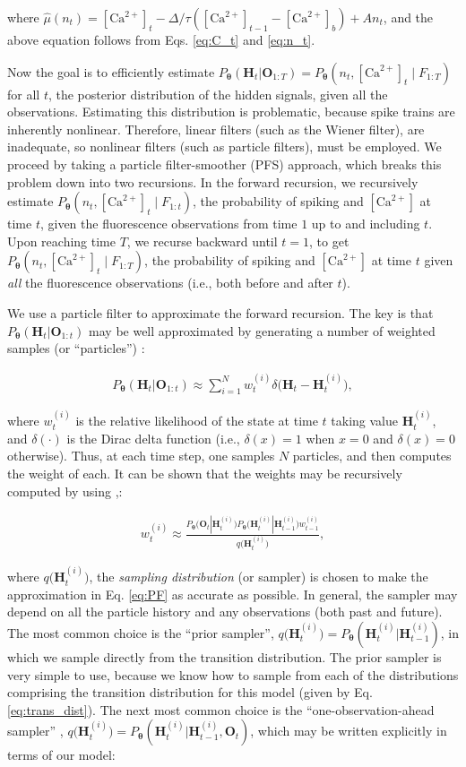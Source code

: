 \documentclass[10pt]{article}
\providecommand{\ve}[1]{\boldsymbol{#1}}
\providecommand{\ve}[1]{\boldsymbol{#1}}
\newcommand{\thetn}{\ve{\theta}}
\newcommand{\p}{P_{\thetn}}
\newcommand{\q}{q\big(\ve{H}_t^{(i)}\big)}
\newcommand{\Ca}{[\text{Ca}^{2+}]}
\begin{document}
\noindent where $\widehat{\mu}(n_t)=\Ca_t - \Delta/\tau(\Ca_{t-1}-\Ca_b) + A n_t$, and the above equation follows from Eqs. \ref{eq:C_t} and \ref{eq:n_t}.

Now the goal is to efficiently estimate $\p(\ve{H}_t | \ve{O}_{1:T})=\p(n_t, \Ca_t \mid F_{1:T})$  for all $t$, the posterior distribution of the hidden signals, given all the observations. Estimating this distribution is problematic, because spike trains are inherently nonlinear.  Therefore, linear filters (such as the Wiener filter), are inadequate, so nonlinear filters (such as particle filters), must be employed.   We proceed by taking a particle filter-smoother (PFS) approach, which breaks this problem down into two recursions.  In the forward recursion, we recursively estimate $\p(n_t, \Ca_t \mid F_{1:t})$, the probability of spiking and $\Ca$ at time $t$, given the fluorescence observations from time $1$ up to and including $t$.  Upon reaching time $T$, we recurse backward until $t=1$, to get $\p(n_t, \Ca_t \mid  F_{1:T})$, the probability of spiking and $\Ca$ at time $t$ given \emph{all} the fluorescence observations (i.e., both before and after $t$).


We use a particle filter to approximate the forward recursion.  The key is that $\p(\ve{H}_t | \ve{O}_{1:t})$ may be well approximated by generating a number of weighted samples (or ``particles'') \cite{DoucetGordon01}:

\begin{align} \label{eq:PF}
\p(\ve{H}_t |  \ve{O}_{1:t}) \approx \sum_{i=1}^N w_t^{(i)} \delta \big( \ve{H}_t - \ve{H}_t^{(i)}\big),
\end{align}

\noindent where $w_t^{(i)}$ is the relative likelihood of the state at time $t$ taking value $\ve{H}_t^{(i)}$, and $\delta(\cdot)$ is the Dirac delta function (i.e., $\delta(x)=1$ when $x=0$ and $\delta(x)=0$ otherwise). Thus, at each time step, one samples $N$ particles, and then computes the weight of each. It can be shown that the weights may be recursively computed by using \cite{DoucetGordon01},:

\begin{align} \label{eq:WEIGHT}
w_t^{(i)} \approx  \frac{\p\big(\ve{O}_t | \ve{H}_t^{(i)}\big) \p\big(\ve{H}_t^{(i)} | \ve{H}_{t-1}^{(i)}\big) w_{t-1}^{(i)}}{\q},
\end{align}

\noindent where $\q$, the \emph{sampling distribution} (or sampler) is chosen to make the approximation in Eq. \ref{eq:PF} as accurate as possible.  In general, the sampler may depend on all the particle history and any observations (both past and future).  The most common choice is the ``prior sampler'',  $\q=\p(\ve{H}_t^{(i)} | \ve{H}_{t-1}^{(i)})$, in which we sample directly from the transition distribution. The prior sampler is very simple to use, because we know how to sample from each of the distributions comprising the transition distribution for this model  (given by Eq. \ref{eq:trans_dist}). The next most common choice is the ``one-observation-ahead sampler'' \cite{DoucetGordon01},  $\q=\p(\ve{H}_t^{(i)} | \ve{H}_{t-1}^{(i)}, \ve{O}_t)$, which may be written explicitly in terms of our model:
\end{document}
